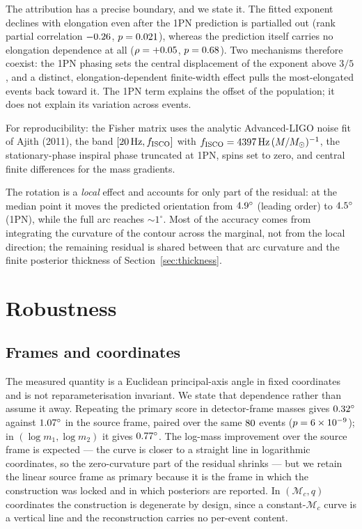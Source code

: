 \documentclass[aps,prd,twocolumn,amsmath,amssymb,nofootinbib,superscriptaddress]{revtex4-2}
\begin{document}
The attribution has a precise boundary, and we state it. The fitted exponent declines with elongation even
after the 1PN prediction is partialled out (rank partial correlation $-0.26$, $p=0.021$),
whereas the prediction itself carries no elongation dependence at all ($\rho=+0.05$,
$p=0.68$). Two mechanisms therefore coexist: the 1PN phasing sets the central displacement of
the exponent above $3/5$, and a distinct, elongation-dependent finite-width effect pulls the
most-elongated events back toward it. The 1PN term explains the offset of the population; it does not
explain its variation across events.

For reproducibility: the Fisher matrix uses the analytic Advanced-LIGO noise fit of Ajith (2011), the
band $[20\,\mathrm{Hz}, f_{\rm ISCO}]$ with $f_{\rm ISCO}=4397\,\mathrm{Hz}\,(M/M_\odot)^{-1}$, the
stationary-phase inspiral phase truncated at 1PN, spins set to zero, and central finite differences for
the mass gradients.

The rotation is a \emph{local} effect and accounts for only part of the residual: at the median point it
moves the predicted orientation from $4.9^\circ$ (leading order) to $4.5^\circ$ (1PN), while
the full arc reaches $\sim\!1^\circ$. Most of the accuracy comes from integrating the curvature of the
contour across the marginal, not from the local direction; the remaining residual is shared between that
arc curvature and the finite posterior thickness of Section~\ref{sec:thickness}.

\section{Robustness}
\label{sec:robust}

\subsection{Frames and coordinates}
\label{sec:frames}
The measured quantity is a Euclidean principal-axis angle in fixed coordinates and is not
reparameterisation invariant. We state that dependence rather than assume it away. Repeating the primary
score in detector-frame masses gives $0.32^\circ$ against $1.07^\circ$ in the source
frame, paired over the same $80$ events ($p=6\times10^{-9}$); in $(\log m_1, \log m_2)$ it gives
$0.77^\circ$. The log-mass improvement over the source frame is expected --- the curve is closer
to a straight line in logarithmic coordinates, so the zero-curvature part of the residual shrinks --- but
we retain the linear source frame as primary because it is the frame in which the construction was locked
and in which posteriors are reported. In $(\mathcal{M}_c, q)$ coordinates the construction is degenerate by design, since a
constant-$\mathcal{M}_c$ curve is a vertical line and the reconstruction carries no per-event content.
\end{document}
